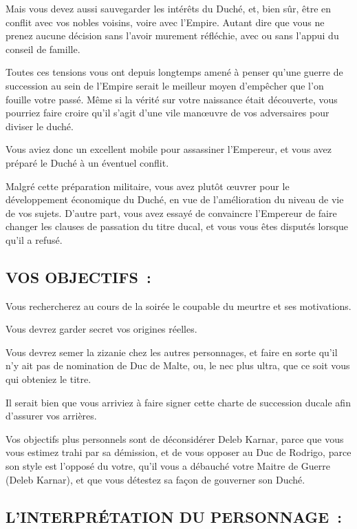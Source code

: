 \documentclass[14pt,twocolumn]{extarticle}
\begin{document}
Mais vous devez aussi sauvegarder les intérêts du Duché, et, bien sûr, être en
conflit avec vos nobles voisins, voire avec l'Empire. Autant dire que vous ne
prenez aucune décision sans l'avoir murement réfléchie, avec ou sans l'appui du
conseil de famille.

Toutes ces tensions vous ont depuis longtemps amené à penser qu'une guerre de
succession au sein de l'Empire serait le meilleur moyen d'empêcher que l'on
fouille votre passé. Même si la vérité sur votre naissance était découverte,
vous pourriez faire croire qu'il s'agit d'une vile man\oe{}uvre de vos
adversaires pour diviser le duché.

Vous aviez donc un excellent mobile pour assassiner l'Empereur, et vous avez
préparé le Duché à un éventuel conflit.

Malgré cette préparation militaire, vous avez plutôt \oe{}uvrer pour le
développement économique du Duché, en vue de l'amélioration du niveau de vie de
vos sujets. D'autre part, vous avez essayé de convaincre l'Empereur de faire
changer les clauses de passation du titre ducal, et vous vous êtes disputés
lorsque qu'il a refusé.

\subsection{VOS OBJECTIFS~:}

Vous rechercherez au cours de la soirée le coupable du meurtre et ses
motivations.

Vous devrez garder secret vos origines réelles.

Vous devrez semer la zizanie chez les autres personnages, et faire en sorte
qu'il n'y ait pas de nomination de Duc de Malte, ou, le nec plus ultra, que ce
soit vous qui obteniez le titre.

Il serait bien que vous arriviez à faire signer cette charte de succession
ducale afin d'assurer vos arrières.

Vos objectifs plus personnels sont de déconsidérer Deleb Karnar, parce que vous
vous estimez trahi par sa démission, et de vous opposer au Duc de Rodrigo,
parce son style est l'opposé du votre, qu'il vous a débauché votre Maitre de
Guerre (Deleb Karnar), et que vous détestez sa façon de gouverner son Duché.

\subsection{L'INTERPRÉTATION DU PERSONNAGE~:}
\end{document}
